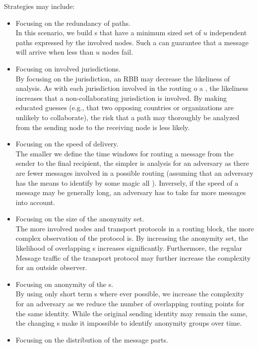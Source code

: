 Strategies may include:
\begin{itemize}
	\item Focusing on the redundancy of paths.\\
	In this scenario, we build s that have a minimum sized set of $u$ independent paths expressed by the involved nodes. Such a  can guarantee that a message will arrive when less than $u$ nodes fail.
	\item Focusing on involved jurisdictions.\\
	By focusing on the jurisdiction, an RBB may decrease the likeliness of analysis. As with each jurisdiction involved in the routing o a \VortexMessage{}, the likeliness increases that a non-collaborating jurisdiction is involved. By making educated guesses (e.g., that two opposing countries or organizations are unlikely to collaborate), the risk that a path may thoroughly be analyzed from the sending node to the receiving node is less likely.
	\item Focusing on the speed of delivery.\\
	The smaller we define the time windows for routing a message from the sender to the final recipient, the simpler is analysis for an adversary as there are fewer messages involved in a possible routing (assuming that an adversary has the means to identify by some magic all \VortexMessages). Inversely, if the speed of a message may be generally long, an adversary has to take far more messages into account.
	\item Focusing on the size of the anonymity set.\\
	The more involved nodes and transport protocols in a routing block, the more complex observation of the protocol is. By increasing the anonymity set, the likelihood of overlapping s increases significantly. Furthermore, the regular Message traffic of the transport protocol may further increase the complexity for an outside observer.
	\item Focusing on anonymity of the s.\\
	By using only short term s where ever possible, we increase the complexity for an adversary as we reduce the number of overlapping routing points for the same identity. While the original sending identity may remain the same, the changing s make it impossible to identify anonymity groups over time.
	\item Focusing on the distribution of the message parts.\\

\end{itemize}
